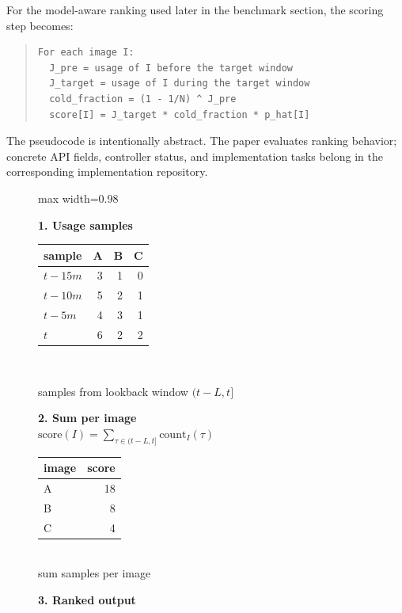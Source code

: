 \documentclass[11pt,a4paper]{article}
\begin{document}
For the model-aware ranking used later in the benchmark section, the scoring step becomes:
\begin{quote}
\small
\begin{verbatim}
For each image I:
  J_pre = usage of I before the target window
  J_target = usage of I during the target window
  cold_fraction = (1 - 1/N) ^ J_pre
  score[I] = J_target * cold_fraction * p_hat[I]
\end{verbatim}
\end{quote}
The pseudocode is intentionally abstract. The paper evaluates ranking behavior; concrete API fields, controller status, and implementation tasks belong in the corresponding implementation repository.

\begin{figure}[H]
\centering
\scriptsize
\begin{adjustbox}{max width=0.98\linewidth}
\begin{minipage}[t]{0.29\linewidth}
\textbf{1. Usage samples}\\[0.4em]
\begin{tabular}{lrrr}
\toprule
sample & A & B & C \\
\midrule
$t-15m$ & 3 & 1 & 0 \\
$t-10m$ & 5 & 2 & 1 \\
$t-5m$ & 4 & 3 & 1 \\
$t$ & 6 & 2 & 2 \\
\bottomrule
\end{tabular}
\\[0.4em]
\footnotesize\raggedright samples from lookback window \((t-L,t]\)
\end{minipage}\hfill
\begin{minipage}[t]{0.30\linewidth}
\textbf{2. Sum per image}\\[0.7em]
\centering
$\displaystyle \mathrm{score}(I)=\sum_{\tau\in(t-L,t]} \mathrm{count}_I(\tau)$
\\[0.9em]
\begin{tabular}{lr}
\toprule
image & score \\
\midrule
A & 18 \\
B & 8 \\
C & 4 \\
\bottomrule
\end{tabular}
\\[0.4em]
\footnotesize sum samples per image
\end{minipage}\hfill
\begin{minipage}[t]{0.34\linewidth}
\textbf{3. Ranked output}\\[0.4em]

\end{minipage}
\end{adjustbox}
\end{figure}
\end{document}
